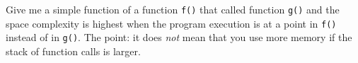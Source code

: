 Give me a simple function of a function \verb!f()! that called
  function \verb!g()! and the space complexity is highest when
  the program execution is at a point in \verb!f()! instead of
  in \verb!g()!.
  The point: it does \textit{not} mean that you use more memory
  if the stack of function calls is larger.
